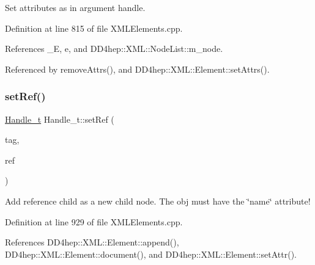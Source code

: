 Set attributes as in argument handle. 



Definition at line 815 of file X\+M\+L\+Elements.\+cpp.



References \+\_\+E, e, and D\+D4hep\+::\+X\+M\+L\+::\+Node\+List\+::m\+\_\+node.



Referenced by remove\+Attrs(), and D\+D4hep\+::\+X\+M\+L\+::\+Element\+::set\+Attrs().

\hypertarget{class_d_d4hep_1_1_x_m_l_1_1_handle__t_a2906b635e870e0f88f60ca39c575bceb}{}\label{class_d_d4hep_1_1_x_m_l_1_1_handle__t_a2906b635e870e0f88f60ca39c575bceb} 
\subsubsection{\texorpdfstring{set\+Ref()}{setRef()}\hspace{0.1cm}{\footnotesize\ttfamily [1/2]}}
{\footnotesize\ttfamily \hyperlink{class_d_d4hep_1_1_x_m_l_1_1_handle__t}{Handle\+\_\+t} Handle\+\_\+t\+::set\+Ref (\begin{DoxyParamCaption}\item[{const \hyperlink{namespace_d_d4hep_1_1_x_m_l_a09e5d9cc86ed782f6826dfe0778c1815}{Xml\+Char} $\ast$}]{tag,  }\item[{const \hyperlink{namespace_d_d4hep_1_1_x_m_l_a09e5d9cc86ed782f6826dfe0778c1815}{Xml\+Char} $\ast$}]{ref }\end{DoxyParamCaption})}



Add reference child as a new child node. The obj must have the \char`\"{}name\char`\"{} attribute! 



Definition at line 929 of file X\+M\+L\+Elements.\+cpp.



References D\+D4hep\+::\+X\+M\+L\+::\+Element\+::append(), D\+D4hep\+::\+X\+M\+L\+::\+Element\+::document(), and D\+D4hep\+::\+X\+M\+L\+::\+Element\+::set\+Attr().

\hypertarget{class_d_d4hep_1_1_x_m_l_1_1_handle__t_ae9a7b050148f90e4df3021b555bf7f3b}{}\label{class_d_d4hep_1_1_x_m_l_1_1_handle__t_ae9a7b050148f90e4df3021b555bf7f3b} 
